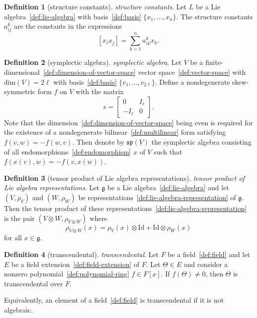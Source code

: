 \documentclass[12pt,a4paper]{article}
\theoremstyle{definition}
\newtheorem{definition}{Definition}
\begin{document}
\begin{definition}[structure constants]\label{def:structure-constants}
\emph{structure constants}. Let $L$ be a Lie algebra~\ref{def:lie-algebra} with basis~\ref{def:basis} $\{x_1,\dots,x_n\}$. The structure constants $a_{ij}^k$ are the constants in the expressions $$[x_ix_j] = \sum_{k=1}^n a_{ik}^k x_k.$$
\end{definition}

\begin{definition}[symplectic algebra]\label{def:symplectic-algebra}
\emph{symplectic algebra}. Let $V$ be a finite-dimensional~\ref{def:dimension-of-vector-space} vector space~\ref{def:vector-space} with $\text{dim}(V)=2\ell$ with basis~\ref{def:basis} $\{v_1,\dots,v_{2\ell}\}$. Define a nondegenerate skew-symmetric form $f$ on $V$ with the matrix $$s = \begin{bmatrix}0 & I_\ell \\ -I_\ell & 0\end{bmatrix}.$$ Note that the dimension~\ref{def:dimension-of-vector-space} being even is required for the existence of a nondegenerate bilinear~\ref{def:multilinear} form satisfying $f(v,w) = -f(w,v)$. Then denote by $\mathfrak{sp}(V)$ the symplectic algebra consisting of all endomorphisms~\ref{def:endomorphism} $x$ of $V$ such that $f(x(v),w) = -f(v,x(w)).$
\end{definition}

\begin{definition}[tensor product of Lie algebra representations]\label{def:tensor-product-of-lie-algebra-representations}
\emph{tensor product of Lie algebra representations}. Let $\mathfrak g$ be a Lie algebra~\ref{def:lie-algebra} and let $(V,\rho_V)$ and $(W,\rho_W)$ be representations~\ref{def:lie-algebra-representation} of $\mathfrak g$. Then the tensor product of these representations~\ref{def:lie-algebra-representation} is the pair $(V\otimes W, \rho_{V\otimes W})$ where $$\rho_{V\otimes W}(x) = \rho_V(x) \otimes \text{Id} + \text{Id}\otimes \rho_W(x)$$ for all $x \in \mathfrak g$.
\end{definition}

\begin{definition}[transcendental]\label{def:transcendental}
\emph{transcendental}. Let $F$ be a field~\ref{def:field} and let $E$ be a field extension~\ref{def:field-extension} of $F$. Let $\Theta \in E$ and consider a nonzero polynomial~\ref{def:polynomial-ring} $f\in F[x]$.  If $f(\Theta)\neq 0$, then $\Theta$ is transcendental over $F$. 

Equivalently, an element of a field~\ref{def:field} is transcendental if it is not algebraic.
\end{definition}
\end{document}
